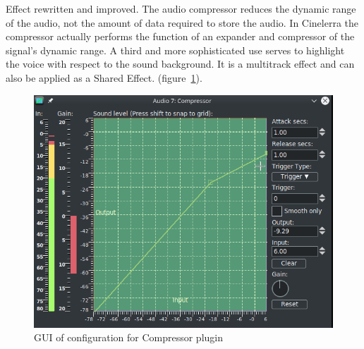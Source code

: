 Effect rewritten and improved.
The audio compressor reduces the dynamic range of the audio, not the amount of data required to store the audio. In Cinelerra the compressor actually performs the function of an expander and compressor of the signal's dynamic range. A third and more sophisticated use serves to highlight the voice with respect to the sound background. It is a multitrack effect and can also be applied as a Shared Effect. (figure~\ref{fig:compressor}).

\begin{figure}[htpb]
    \centering
    \includegraphics[width=0.7\linewidth]{images/compressor.png}
    \caption{GUI of configuration for Compressor plugin}
    \label{fig:compressor}
\end{figure}

